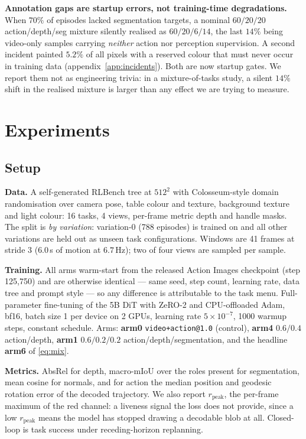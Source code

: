 \documentclass{article} %
\newcommand{\tmpl}[1]{\texttt{#1}}
\newcommand{\appref}[1]{appendix~\ref{#1}}
\begin{document}
\textbf{Annotation gaps are startup errors, not training-time degradations.} When $70\%$ of
episodes lacked segmentation targets, a nominal $60/20/20$ action/depth/seg mixture silently
realised as $60/20/6/14$, the last $14\%$ being video-only samples carrying \emph{neither} action
nor perception supervision. A second incident painted $5.2\%$ of all pixels with a reserved colour
that must never occur in training data (\appref{app:incidents}). Both are now startup gates. We
report them not as engineering trivia: in a mixture-of-tasks study, a silent $14\%$ shift in the
realised mixture is larger than any effect we are trying to measure.

\section{Experiments}
\label{sec:exp}

\subsection{Setup}
\label{sec:setup}

\textbf{Data.} A self-generated RLBench \citep{james2020rlbench} tree at $512^2$ with
Colosseum-style domain randomisation \citep{pumacay2024colosseum} over camera pose, table colour
and texture, background texture and light colour: 16 tasks, 4 views, per-frame metric depth and
handle masks. The split is \emph{by variation}: variation-0 (788 episodes) is trained on and all
other variations are held out as unseen task configurations. Windows are 41 frames at stride 3
($6.0$\,s of motion at $6.7$\,Hz); two of four views are sampled per sample.

\textbf{Training.} All arms warm-start from the released Action Images checkpoint (step
125{,}750) and are otherwise identical --- same seed, step count, learning rate, data tree and
prompt style --- so any difference is attributable to the task menu. Full-parameter fine-tuning of
the 5B DiT with ZeRO-2 and CPU-offloaded Adam, bf16, batch size 1 per device on 2 GPUs, learning
rate $5\times10^{-7}$, 1000 warmup steps, constant schedule. Arms: \textbf{arm0}
\tmpl{video+action@1.0} (control), \textbf{arm4} $0.6/0.4$ action/depth, \textbf{arm1}
$0.6/0.2/0.2$ action/depth/segmentation, and the headline \textbf{arm6} of \eqref{eq:mix}.

\textbf{Metrics.} AbsRel for depth, macro-mIoU over the roles present for segmentation, mean
cosine for normals, and for action the median position and geodesic rotation error of the decoded
trajectory. We also report $r_{\text{peak}}$, the per-frame maximum of the red channel: a liveness
signal the loss does not provide, since a low $r_{\text{peak}}$ means the model has stopped drawing
a decodable blob at all. Closed-loop is task success under receding-horizon replanning.
\end{document}
